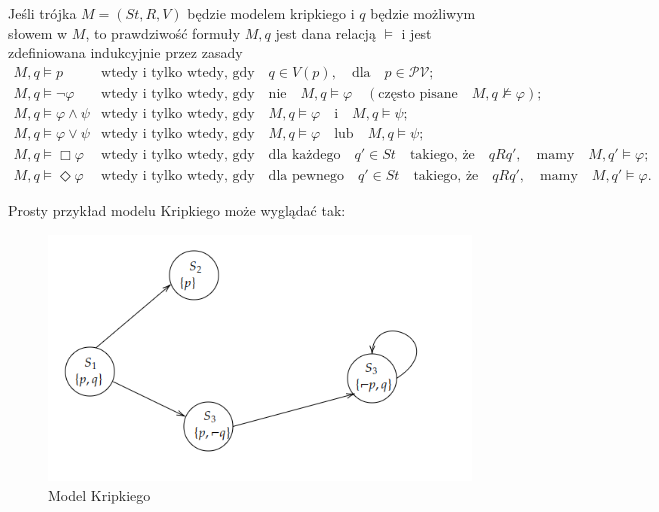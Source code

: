 Jeśli trójka $M=(St,R,V)$ będzie modelem kripkiego i $q$ będzie możliwym słowem w $M$,
to prawdziwość formuły $M,q$ jest dana relacją $ \models $ i jest zdefiniowana indukcyjnie 
przez zasady
\[
\begin{array}{ll}
M, q \models p & \text{wtedy i tylko wtedy, gdy} \quad q \in V(p), \quad \text{dla} \quad p \in \mathcal{PV}; \\
M, q \models \neg \varphi & \text{wtedy i tylko wtedy, gdy} \quad \text{nie} \quad M, q \models \varphi \quad (\text{często pisane} \quad M, q \not\models \varphi); \\
M, q \models \varphi \land \psi & \text{wtedy i tylko wtedy, gdy} \quad M, q \models \varphi \quad \text{i} \quad M, q \models \psi; \\
M, q \models \varphi \lor \psi & \text{wtedy i tylko wtedy, gdy} \quad M, q \models \varphi \quad \text{lub} \quad M, q \models \psi; \\
M, q \models \Box \varphi & \text{wtedy i tylko wtedy, gdy} \quad \text{dla każdego} \quad q' \in St \quad \text{takiego, że} \quad q R q', \quad \text{mamy} \quad M, q' \models \varphi; \\
M, q \models \Diamond \varphi & \text{wtedy i tylko wtedy, gdy} \quad \text{dla pewnego} \quad q' \in St \quad \text{takiego, że} \quad q R q', \quad \text{mamy} \quad M, q' \models \varphi.
\end{array}
\]

Prosty przykład modelu Kripkiego może wyglądać tak:

\begin{figure}[h]
    \centering
    \includegraphics[width=\linewidth]{figures/kripke_model.png}
    \caption{Model Kripkiego}
    \label{fig:enter-label}
  \end{figure}

